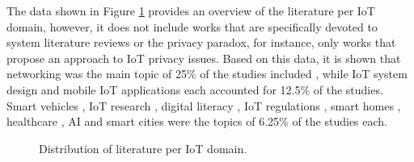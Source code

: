 The data shown in Figure \ref{fig:literature_domain} provides an overview
of the literature per IoT domain, however, it does not include works that are
specifically devoted to system literature reviews or the privacy paradox, for
instance, only works that propose an approach to IoT privacy issues.
Based on this data, it is shown that networking was the main topic of
25\% of the studies included \cite{SunSecure, AliIoT, electronics12122589, KumarLTE},
while IoT system design \cite{opara2022framework, perera2020designing} and
mobile IoT applications \cite{FengDesign, DasPersonalized} each accounted
for 12.5\% of the studies. Smart vehicles \cite{zhao2020local}, IoT
research \cite{koohang2022internet}, digital literacy \cite{SkirpanPrivacy},
IoT regulations \cite{hadzovic2023path}, smart homes \cite{xiong2018defending},
healthcare \cite{AntunesFederated}, AI \cite{zhang2017privacy} and
smart cities \cite{ZhuIntegrating} were the topics of 6.25\% of the studies
each.

\begin{figure}
    \centering
    \caption{Distribution of literature per IoT domain.}
    \label{fig:literature_domain}
\end{figure}

